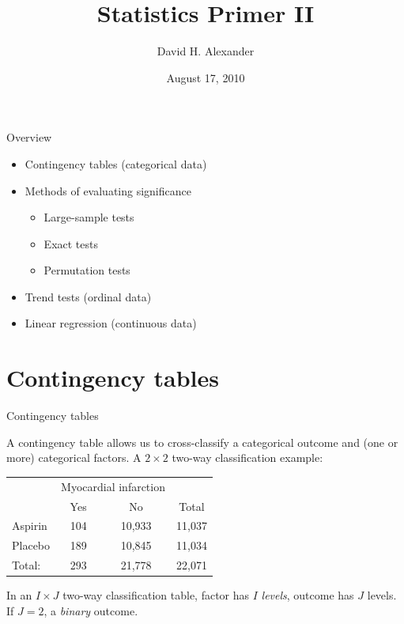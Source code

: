 \documentclass[serif,mathserif,professionalfonts]{beamer}
\title{Statistics Primer II}
\author{David H. Alexander}
\date{August 17, 2010}
\begin{document}
\setlength{\parskip}{10pt plus 1pt minus 1pt}

\maketitle

\begin{frame}{Overview}
\begin{itemize}
\item Contingency tables (categorical data)
\item Methods of evaluating significance
 \begin{itemize}
 \item Large-sample tests
 \item Exact tests
 \item Permutation tests
\end{itemize}
\item Trend tests (ordinal data)
\item Linear regression (continuous data)
\end{itemize}

\end{frame}

\section{Contingency tables}

\begin{frame}{Contingency tables}

  A contingency table allows us to cross-classify a categorical
  outcome and (one or more) categorical factors.  A $2 \times 2$
  two-way classification example:

\vspace{-0.3cm}
\begin{center}
\begin{tabular}{lccc}
                  & \multicolumn{2}{c}{Myocardial infarction} &          \\
                          \cmidrule{2-3}                             
           &        Yes       &               No                & Total  \\  \midrule  
Aspirin    &        104       &             10,933              & 11,037 \\  
Placebo    &        189       &             10,845              & 11,034 \\ \midrule
Total:     &        293       &             21,778              & 22,071  
\end{tabular}
\end{center}

In an $I \times J$ two-way classification table, factor has $I$
\emph{levels}, outcome has $J$ levels. If $J=2$, a \emph{binary}
outcome.

\end{frame}
\end{document}

